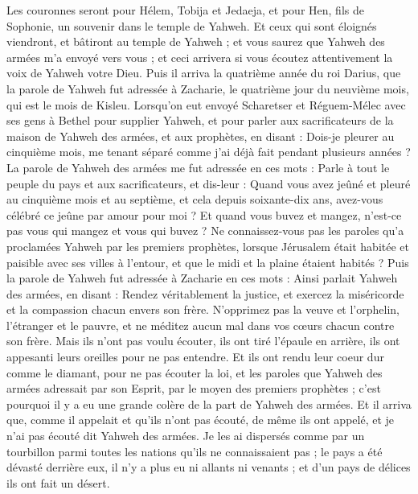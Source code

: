 \begin{multicols}{2}
Les couronnes seront pour Hélem, Tobija et Jedaeja, et pour Hen, fils de Sophonie, un souvenir dans le temple de Yahweh.
 Et ceux qui sont éloignés viendront, et bâtiront au temple de Yahweh ; et vous saurez que Yahweh des armées m'a envoyé vers vous ; et ceci arrivera si vous écoutez attentivement la voix de Yahweh votre Dieu.
\VerseOne{}Puis il arriva la quatrième année du roi Darius, que la parole de Yahweh fut adressée à Zacharie, le quatrième jour du neuvième mois, qui est le mois de Kisleu.
Lorsqu'on eut envoyé Scharetser et Réguem-Mélec avec ses gens à Bethel pour supplier Yahweh,
et pour parler aux sacrificateurs de la maison de Yahweh des armées, et aux prophètes, en disant : Dois-je pleurer au cinquième mois, me tenant séparé comme j'ai déjà fait pendant plusieurs années ?
La parole de Yahweh des armées me fut adressée en ces mots :
Parle à tout le peuple du pays et aux sacrificateurs, et dis-leur : Quand vous avez jeûné et pleuré au cinquième mois et au septième, et cela depuis soixante-dix ans, avez-vous célébré ce jeûne par amour pour moi ?
Et quand vous buvez et mangez, n'est-ce pas vous qui mangez et vous qui buvez ?
Ne connaissez-vous pas les paroles qu'a proclamées Yahweh par les premiers prophètes, lorsque Jérusalem était habitée et paisible avec ses villes à l'entour, et que le midi et la plaine étaient habités ?
Puis la parole de Yahweh fut adressée à Zacharie en ces mots :
Ainsi parlait Yahweh des armées, en disant : Rendez véritablement la justice, et exercez la miséricorde et la compassion chacun envers son frère.
N'opprimez pas la veuve et l'orphelin, l'étranger et le pauvre, et ne méditez aucun mal dans vos cœurs chacun contre son frère.
Mais ils n'ont pas voulu écouter, ils ont tiré l'épaule en arrière, ils ont appesanti leurs oreilles pour ne pas entendre.
Et ils ont rendu leur coeur dur comme le diamant, pour ne pas écouter la loi, et les paroles que Yahweh des armées adressait par son Esprit, par le moyen des premiers prophètes ; c'est pourquoi il y a eu une grande colère de la part de Yahweh des armées.
Et il arriva que, comme il appelait et qu'ils n'ont pas écouté, de même ils ont appelé, et je n'ai pas écouté dit Yahweh des armées.
Je les ai dispersés comme par un tourbillon parmi toutes les nations qu'ils ne connaissaient pas ; le pays a été dévasté derrière eux, il n'y a plus eu ni allants ni venants ; et d'un pays de délices ils ont fait un désert.

\end{multicols}
